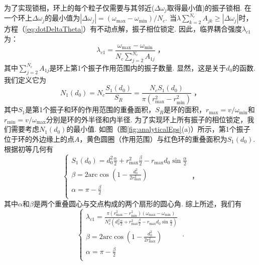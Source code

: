 \documentclass{article}
\begin{document}
为了实现锁相，环上的每个粒子仅需要与其邻近($\Delta\omega_j$取得最小值)的振子锁相. 在一个环上$\Delta\omega_j$的最小值为$\left| \Delta \omega _j \right|=\left( \omega _{\max}-\omega _{\min} \right) /N_c$. 当$\lambda \sum_{k=2}^{N_c}{A_{jk}} \geqslant \left| \Delta \omega _j \right|$时，方程（\ref{eq:dotDeltaTheta}）有不动点解，振子相位锁定. 因此，临界耦合强度$\lambda_{c1}$为：
\begin{equation}
    \lambda _{c1}=\frac{\omega _{\max}-\omega _{\min}}{N_c\sum\nolimits_{j=2}^{N_c}{A_{1j}}}\;，
\end{equation}
其中$\sum\nolimits_{j=2}^{N_c}{A_{1j}}$是环上第1个振子作用范围内的振子数量. 显然，这是关于$d_0$的函数. 我们定义它为
\begin{equation}
    N_1\left( d_0 \right) =N_c\frac{S_1\left( d_0 \right)}{S_R}=\frac{N_cS_1\left( d_0 \right)}{\pi \left( r_{\max}^{2}-r_{\min}^{2} \right)}\;，
\end{equation}
其中$S_1$是第1个振子和环的作用范围的重叠面积，$S_R$是环的面积，$r_{\max}=v/\omega_{\min}$和$r_{\min}=v/\omega_{\max}$分别是环的外半径和内半径. 为了实现环上所有振子的相位锁定，我们需要考虑$N_1\left( d_0\right)$的最小值. 如图（图\ref{fig:analyticalEps}(a)）所示，第1个振子位于环的外边缘上的点$A$，黄色圆圈（作用范围）与红色环的重叠面积为$S_1\left( d_0 \right)$. 根据初等几何有
\begin{equation}\label{eq:S1}
    \begin{cases}
        S_1\left( d_0 \right) =d_{0}^{2}\frac{\alpha}{2}+r_{\max}^{2}\frac{\beta}{2}-r_{\max}d_0\sin \frac{\alpha}{2}\\
        \beta =2\mathrm{arc}\cos \left( 1-\frac{d_{0}^{2}}{2r_{\max}^{2}} \right)\\
        \alpha =\pi -\frac{\beta}{2}\\
    \end{cases}\;，
\end{equation}
其中$\alpha$和$\beta$是两个重叠圆心与交点构成的两个扇形的圆心角. 综上所述，我们有
\begin{equation}
    \begin{cases}
        \lambda _{c1}=\frac{\pi \left( r_{\max}^{2}-r_{\min}^{2} \right) \left( \omega _{\max}-\omega _{\min} \right)}{N_{c}^{2}\left( d_{0}^{2}\frac{\alpha}{2}+r_{\max}^{2}\frac{\beta}{2}-r_{\max}d_0\sin \frac{\alpha}{2} \right)}\\
        \beta =2\mathrm{arc}\cos \left( 1-\frac{d_{0}^{2}}{2r_{\max}^{2}} \right)\\
        \alpha =\pi -\frac{\beta}{2}\\
    \end{cases}\;. 
\end{equation}
\end{document}
